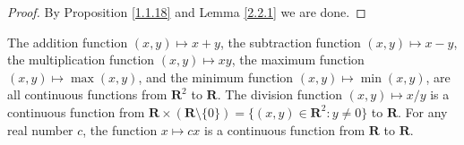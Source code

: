 \begin{proof}
    By Proposition \ref{1.1.18} and Lemma \ref{2.2.1} we are done.
\end{proof}

\begin{lemma}\label{2.2.2}
    The addition function \((x, y) \mapsto x + y\), the subtraction function \((x, y) \mapsto x - y\), the multiplication function \((x, y) \mapsto xy\), the maximum function \((x, y) \mapsto \max(x, y)\), and the minimum function \((x, y) \mapsto \min(x, y)\), are all continuous functions from \(\mathbf{R}^2\) to \(\mathbf{R}\).
    The division function \((x, y) \mapsto x / y\) is a continuous function from \(\mathbf{R} \times (\mathbf{R} \setminus \{0\}) = \{(x, y) \in \mathbf{R}^2 : y \neq 0\}\) to \(\mathbf{R}\).
    For any real number \(c\), the function \(x \mapsto cx\) is a continuous function from \(\mathbf{R}\) to \(\mathbf{R}\).
\end{lemma}

